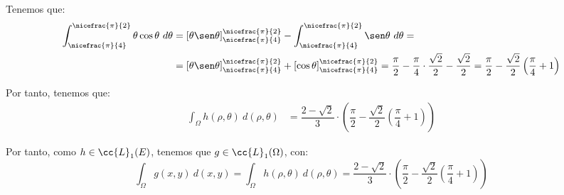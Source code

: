 \begin{ejercicio}
    Tenemos que:
    \begin{align*}
        \int_{\nicefrac{\pi}{4}}^{\nicefrac{\pi}{2}} \theta\cos\theta~d\theta &= \left[\theta\sen\theta\right]_{\nicefrac{\pi}{4}}^{\nicefrac{\pi}{2}} - \int_{\nicefrac{\pi}{4}}^{\nicefrac{\pi}{2}} \sen\theta~d\theta =\\
        &= \left[\theta\sen\theta\right]_{\nicefrac{\pi}{4}}^{\nicefrac{\pi}{2}} + \left[\cos\theta\right]_{\nicefrac{\pi}{4}}^{\nicefrac{\pi}{2}} = \dfrac{\pi}{2} - \dfrac{\pi}{4}\cdot \dfrac{\sqrt{2}}{2} -\dfrac{\sqrt{2}}{2}
        = \dfrac{\pi}{2} - \dfrac{\sqrt{2}}{2}\left(\dfrac{\pi}{4}+1\right)
    \end{align*}


    Por tanto, tenemos que:
    \begin{align*}
        \int_{\Omega} h(\rho, \theta)~d(\rho, \theta) &=
        \dfrac{2-\sqrt{2}}{3} \cdot \left(\dfrac{\pi}{2} - \dfrac{\sqrt{2}}{2}\left(\dfrac{\pi}{4}+1\right)\right)
    \end{align*}

    Por tanto, como $h\in \cc{L}_1(E)$, tenemos que $g\in \cc{L}_1(\Omega)$, con:
    \begin{equation*}
        \int_{\Omega} g(x, y)~d(x, y) = \int_{\Omega} h(\rho, \theta)~d(\rho, \theta) = \dfrac{2-\sqrt{2}}{3} \cdot \left(\dfrac{\pi}{2} - \dfrac{\sqrt{2}}{2}\left(\dfrac{\pi}{4}+1\right)\right)
    \end{equation*}
    

\end{ejercicio}


